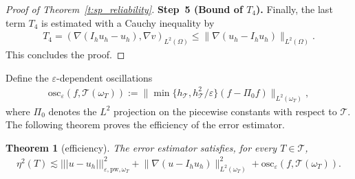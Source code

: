 \documentclass[a4paper]{amsart}
\newtheorem{theorem}{Theorem}
\theoremstyle{definition}
\numberwithin{equation}{section}
\numberwithin{theorem}{section}
\newcommand{\pw}{\mathrm{pw}}
\newcommand{\osc}{\mathrm{osc}}
\newcommand{\tri}{\mathcal{T}}
\newcommand{\ennorm}[1]{\lvert\!\lvert\!\lvert #1 \rvert\!\rvert\!\rvert}
\begin{document}
\begin{proof}[Proof of Theorem~\ref{t:sp_reliability}]
    \textbf{Step~5 (Bound of $T_4$).}
    Finally, the last term $T_4$
    is estimated with a Cauchy inequality by
    \begin{align*}
       T_4= (\nabla (I_h u_h-u_h),\nabla  v)_{L^2(\Omega)}
        \leq \lVert \nabla (u_h-I_h u_h)\rVert_{L^2(\Omega)} .
    \end{align*}
    This concludes the proof.
\end{proof}

Define the $\varepsilon$-dependent oscillations 
\begin{align*}
    \osc_\varepsilon(f,\tri(\omega_T))
        := \lVert \min\{h_\tri,h_\tri^2/\varepsilon\} (f-\Pi_0 f)\rVert_{L^2(\omega_T)},
\end{align*}
where $\Pi_0$ denotes the $L^2$ projection on the piecewise
constants with respect to $\tri$.
The following theorem proves the efficiency of the error estimator.

\begin{theorem}[efficiency]\label{t:sp_efficiency}
    The error estimator satisfies, for every $T\in\tri$,
    \begin{align*}
        \eta^2(T)
          \lesssim \ennorm{u-u_h}_{\varepsilon,\pw,\omega_T}^2
            +\lVert \nabla (u-I_h u_h)\rVert_{L^2(\omega_T)}^2
            +\osc_\varepsilon(f,\tri(\omega_T)).
    \end{align*}
\end{theorem}
\end{document}

